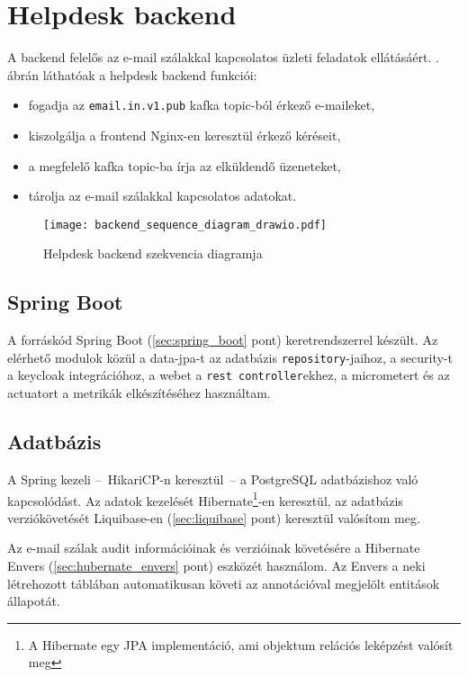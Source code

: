 \section{Helpdesk backend}\label{sec:backend}
A backend felelős az e-mail szálakkal kapcsolatos üzleti feladatok ellátásáért. . ábrán láthatóak a helpdesk backend funkciói:
\begin{itemize}
	\item fogadja az \texttt{email.in.v1.pub} kafka topic-ból érkező e-maileket, 
	\item kiszolgálja a frontend Nginx-en keresztül érkező kéréseit,
	\item a megfelelő kafka topic-ba írja az elküldendő üzeneteket,
	\item tárolja az e-mail szálakkal kapcsolatos adatokat.
\end{itemize}


\begin{figure}[hbt] 
	\centering
	\texttt{[image: backend\_sequence\_diagram\_drawio.pdf]}
	\caption{Helpdesk backend szekvencia diagramja}
	\label{fig:backend_sequence_diagram}
\end{figure}


\subsection{Spring Boot}
A forráskód Spring Boot (\ref{sec:spring_boot} pont) keretrendszerrel készült. Az elérhető modulok közül a data-jpa-t az adatbázis \texttt{repository}-jaihoz, a security-t a keycloak integrációhoz, a webet a \texttt{rest controller}ekhez, a micrometert és az actuatort a metrikák elkészítéséhez használtam.	


\subsection{Adatbázis}\label{sec:adatbazis}
A Spring kezeli --~HikariCP-n keresztül~--   a PostgreSQL adatbázishoz való kapcsolódást.
Az adatok kezelését Hibernate\footnote{A Hibernate egy JPA implementáció, ami objektum relációs leképzést valósít meg}-en keresztül, az adatbázis verziókövetését Liquibase-en (\ref{sec:liquibase} pont) keresztül valósítom meg. 

Az e-mail szálak audit információinak és verzióinak követésére a Hibernate Envers (\ref{sec:hubernate_envers} pont) eszközét használom. Az Envers a neki létrehozott táblában automatikusan követi az annotációval megjelölt entitások állapotát.

